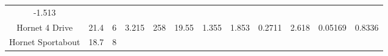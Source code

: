 \documentclass[]{article}
\theoremstyle{definition}
\theoremstyle{definition}
\theoremstyle{definition}
\theoremstyle{remark}
\begin{document}
\begin{longtable}[]{@{}cccccccccccc@{}}
\begin{minipage}[t]{0.06\columnwidth}
-1.513\strut
\end{minipage}\tabularnewline
\begin{minipage}[t]{0.11\columnwidth}\centering\strut
Hornet 4 Drive\strut
\end{minipage} & \begin{minipage}[t]{0.04\columnwidth}\centering\strut
21.4\strut
\end{minipage} & \begin{minipage}[t]{0.08\columnwidth}\centering\strut
6\strut
\end{minipage} & \begin{minipage}[t]{0.04\columnwidth}\centering\strut
3.215\strut
\end{minipage} & \begin{minipage}[t]{0.04\columnwidth}\centering\strut
258\strut
\end{minipage} & \begin{minipage}[t]{0.05\columnwidth}\centering\strut
19.55\strut
\end{minipage} & \begin{minipage}[t]{0.05\columnwidth}\centering\strut
1.355\strut
\end{minipage} & \begin{minipage}[t]{0.05\columnwidth}\centering\strut
1.853\strut
\end{minipage} & \begin{minipage}[t]{0.05\columnwidth}\centering\strut
0.2711\strut
\end{minipage} & \begin{minipage}[t]{0.05\columnwidth}\centering\strut
2.618\strut
\end{minipage} & \begin{minipage}[t]{0.06\columnwidth}\centering\strut
0.05169\strut
\end{minipage} & \begin{minipage}[t]{0.06\columnwidth}\centering\strut
0.8336\strut
\end{minipage}\tabularnewline
\begin{minipage}[t]{0.11\columnwidth}\centering\strut
Hornet Sportabout\strut
\end{minipage} & \begin{minipage}[t]{0.04\columnwidth}\centering\strut
18.7\strut
\end{minipage} & \begin{minipage}[t]{0.08\columnwidth}\centering\strut
8\strut
\end{minipage} & \begin{minipage}[t]{0.04\columnwidth}\centering\strut

\end{minipage}
\end{longtable}
\end{document}

